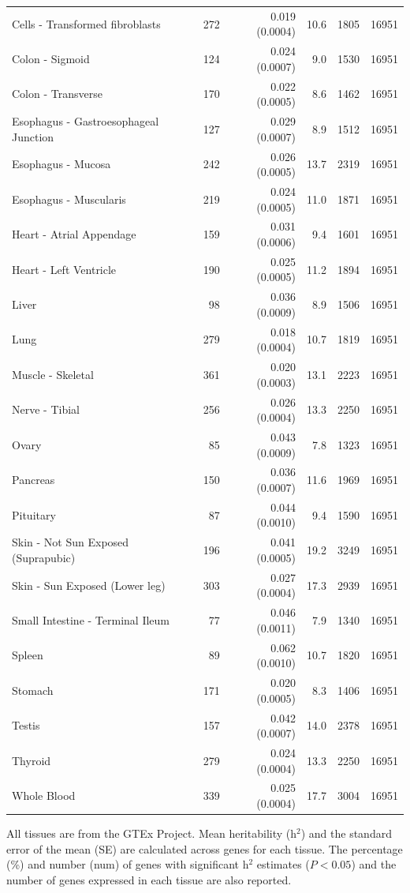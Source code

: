 \documentclass[10pt,letterpaper]{article}
\begin{document}
\begin{table}[!ht]
\begin{adjustwidth}{-2.25in}{0in}
\begin{tabular}{lrrrrr}
  Cells - Transformed fibroblasts & 272 & 0.019 (0.0004) & 10.6 & 1805 & 16951 \\ 
  Colon - Sigmoid & 124 & 0.024 (0.0007) & 9.0 & 1530 & 16951 \\ 
  Colon - Transverse & 170 & 0.022 (0.0005) & 8.6 & 1462 & 16951 \\ 
  Esophagus - Gastroesophageal Junction & 127 & 0.029 (0.0007) & 8.9 & 1512 & 16951 \\ 
  Esophagus - Mucosa & 242 & 0.026 (0.0005) & 13.7 & 2319 & 16951 \\ 
  Esophagus - Muscularis & 219 & 0.024 (0.0005) & 11.0 & 1871 & 16951 \\ 
  Heart - Atrial Appendage & 159 & 0.031 (0.0006) & 9.4 & 1601 & 16951 \\ 
  Heart - Left Ventricle & 190 & 0.025 (0.0005) & 11.2 & 1894 & 16951 \\ 
  Liver & 98 & 0.036 (0.0009) & 8.9 & 1506 & 16951 \\ 
  Lung & 279 & 0.018 (0.0004) & 10.7 & 1819 & 16951 \\ 
  Muscle - Skeletal & 361 & 0.020 (0.0003) & 13.1 & 2223 & 16951 \\ 
  Nerve - Tibial & 256 & 0.026 (0.0004) & 13.3 & 2250 & 16951 \\ 
  Ovary & 85 & 0.043 (0.0009) & 7.8 & 1323 & 16951 \\ 
  Pancreas & 150 & 0.036 (0.0007) & 11.6 & 1969 & 16951 \\ 
  Pituitary & 87 & 0.044 (0.0010) & 9.4 & 1590 & 16951 \\ 
  Skin - Not Sun Exposed (Suprapubic) & 196 & 0.041 (0.0005) & 19.2 & 3249 & 16951 \\ 
  Skin - Sun Exposed (Lower leg) & 303 & 0.027 (0.0004) & 17.3 & 2939 & 16951 \\ 
  Small Intestine - Terminal Ileum & 77 & 0.046 (0.0011) & 7.9 & 1340 & 16951 \\ 
  Spleen & 89 & 0.062 (0.0010) & 10.7 & 1820 & 16951 \\ 
  Stomach & 171 & 0.020 (0.0005) & 8.3 & 1406 & 16951 \\ 
  Testis & 157 & 0.042 (0.0007) & 14.0 & 2378 & 16951 \\ 
  Thyroid & 279 & 0.024 (0.0004) & 13.3 & 2250 & 16951 \\ 
  Whole Blood & 339 & 0.025 (0.0004) & 17.7 & 3004 & 16951 \\ 
   \hline
\end{tabular}
\begin{flushleft} All tissues are from the GTEx Project. Mean heritability (h$^2$) and the standard error of the mean (SE) are calculated across genes for each tissue. The percentage (\%) and number (num) of genes with significant h$^2$ estimates ($P<0.05$) and the number of genes expressed in each tissue are also reported. 
\end{flushleft}
\end{adjustwidth}
\end{table}
\end{document}
